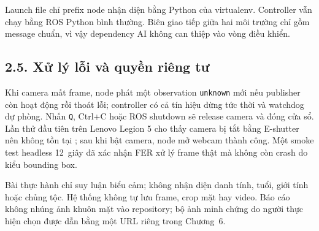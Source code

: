 Launch file chỉ prefix node nhận diện bằng Python của virtualenv. Controller
vẫn chạy bằng ROS Python bình thường. Biên giao tiếp giữa hai môi trường chỉ
gồm message chuẩn, vì vậy dependency AI không can thiệp vào vòng điều khiển.

\subsection*{2.5. Xử lý lỗi và quyền riêng tư}

Khi camera mất frame, node phát một observation \texttt{unknown} mới nếu
publisher còn hoạt động rồi thoát lỗi; controller có cả tín hiệu dừng tức thời
và watchdog dự phòng. Nhấn \texttt{Q}, Ctrl+C hoặc ROS shutdown sẽ release
camera và đóng cửa sổ. Lần thử đầu tiên trên Lenovo Legion 5 cho thấy camera
bị tắt bằng E-shutter nên không tồn tại ; sau khi bật camera,
node mở webcam thành công. Một smoke test headless 12~giây đã xác nhận FER xử
lý frame thật mà không còn crash do kiểu bounding box.

Bài thực hành chỉ suy luận biểu cảm; không nhận diện danh tính, tuổi, giới tính
hoặc chủng tộc. Hệ thống không tự lưu frame, crop mặt hay video. Báo cáo không
nhúng ảnh khuôn mặt vào repository; bộ ảnh minh chứng do người thực hiện chọn
được dẫn bằng một URL riêng trong Chương~6.
